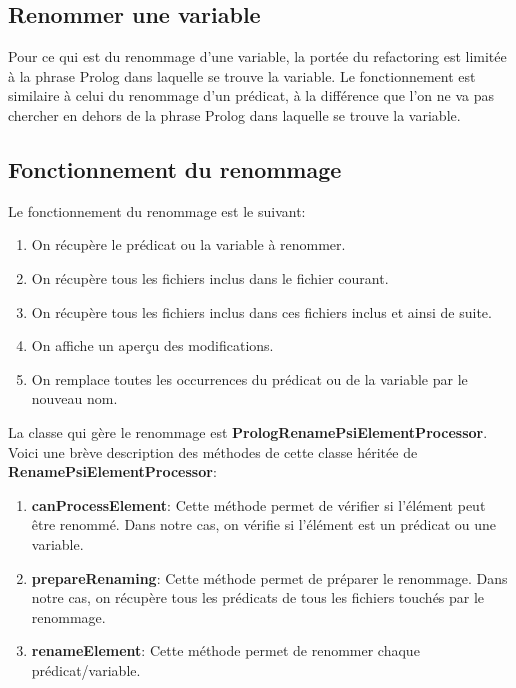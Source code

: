\subsection{Renommer une variable}
\noindent Pour ce qui est du renommage d'une variable, la portée du refactoring est limitée à la phrase Prolog dans laquelle se trouve la variable.
\newdoubleline
Le fonctionnement est similaire à celui du renommage d'un prédicat, à la différence que l'on ne va pas chercher en dehors de la phrase Prolog dans laquelle se trouve la variable.

\subsection{Fonctionnement du renommage}
\noindent Le fonctionnement du renommage est le suivant:
\begin{enumerate}
    \item On récupère le prédicat ou la variable à renommer.
    \item On récupère tous les fichiers inclus dans le fichier courant.
    \item On récupère tous les fichiers inclus dans ces fichiers inclus et ainsi de suite.
    \item On affiche un aperçu des modifications.
    \item On remplace toutes les occurrences du prédicat ou de la variable par le nouveau nom.
\end{enumerate}

\noindent La classe qui gère le renommage est \textbf{PrologRenamePsiElementProcessor}.
Voici une brève description des méthodes de cette classe héritée de \textbf{RenamePsiElementProcessor}:
\begin{enumerate}
    \item \textbf{canProcessElement}: Cette méthode permet de vérifier si l'élément peut être renommé. Dans notre cas, on vérifie si l'élément est un prédicat ou une variable.
    \item \textbf{prepareRenaming}: Cette méthode permet de préparer le renommage. Dans notre cas, on récupère tous les prédicats de tous les fichiers touchés par le renommage.
    \item \textbf{renameElement}: Cette méthode permet de renommer chaque prédicat/variable.
\end{enumerate}